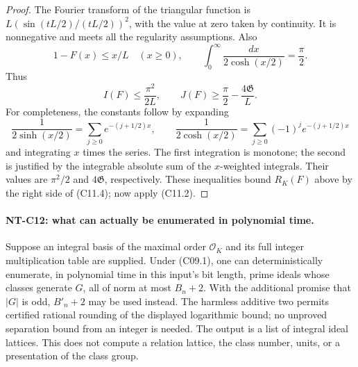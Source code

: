 \begin{proof}
The Fourier transform of the triangular function is
\(L(\sin(tL/2)/(tL/2))^2\), with the value at zero taken
by continuity. It is nonnegative and meets all the
regularity assumptions. Also
\[
 1-F(x)\le x/L\quad(x\ge0),\qquad
 \int_0^\infty\frac{dx}{2\cosh(x/2)}=\frac\pi2.
\]
Thus
\[
 I(F)\le\frac{\pi^2}{2L},\qquad
 J(F)\ge\frac\pi2-\frac{4{\mathfrak G}}L.
 \]
For completeness, the constants follow by expanding
\[
 \frac1{2\sinh(x/2)}
       =\sum_{j\ge0}e^{-(j+1/2)x},\qquad
 \frac1{2\cosh(x/2)}
       =\sum_{j\ge0}(-1)^j e^{-(j+1/2)x}
\]
and integrating \(x\) times the series. The first integration
is monotone; the second is justified by the integrable
absolute sum of the \(x\)-weighted integrals. Their values
are \(\pi^2/2\) and \(4{\mathfrak G}\), respectively.
These inequalities bound \(R_K(F)\) above by the right
side of (C11.4); now apply (C11.2).
\end{proof}

\paragraph{NT-C12: what can actually be enumerated in polynomial time.}
Suppose an integral basis of the maximal order \(\mathcal O_K\)
and its full integer multiplication table are supplied.
Under (C09.1), one can deterministically enumerate, in
polynomial time in this input's bit length, prime ideals
whose classes generate \(G\), all of norm at most \(B_n+2\).
With the additional promise that \(|G|\) is odd, \(B'_n+2\)
may be used instead. The harmless additive two permits
certified rational rounding of the displayed logarithmic
bound; no unproved separation bound from an integer is needed.
The output is a list of integral ideal lattices.
This does not compute a relation lattice, the class number,
units, or a presentation of the class group.


